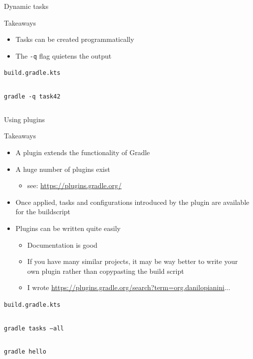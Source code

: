 \documentclass[presentation]{beamer}
\newcommand{\codefile}[4]{
	\begin{block}{\texttt{#2}}
		\inputminted[fontsize=#3,linenos=true,breaklines=true]{#4}{"workspace/#1/#2"}
	\end{block}
}
\newcommand{\kotlin}[3]{\codefile{#1}{#2}{#3}{kotlin}}
\newcommand{\terminal}[3]{\codefile{#1}{#2}{#3}{text}}
\newcommand{\tinier}{\fontsize{4pt}{5pt}\selectfont}
\begin{document}
\begin{frame}{Dynamic tasks}
    \begin{block}{Takeaways}
        \begin{itemize}
            \item Tasks can be created programmatically
            \item The \texttt{-q} flag quietens the output
        \end{itemize}
    \end{block}
    \kotlin{05-DynamicTasks}{build.gradle.kts}{\scriptsize}
    \terminal{05-DynamicTasks}{gradle -q task42}{\normalsize}
\end{frame}

\begin{frame}{Using plugins}
    \begin{block}{Takeaways}
        \begin{itemize}
            \item A plugin extends the functionality of Gradle
            \item A huge number of plugins exist
            \begin{itemize}
                \item see: \url{https://plugins.gradle.org/}
            \end{itemize}
            \item Once applied, tasks and configurations introduced by the plugin are available for the buildscript
            \item Plugins can be written quite easily
            \begin{itemize}
                \item Documentation is good
                \item If you have many similar projects, it may be way better to write your own plugin rather than copypasting the build script
                \item I wrote \href{several plugins myself}{https://plugins.gradle.org/search?term=org.danilopianini}...
            \end{itemize}
        \end{itemize}
    \end{block}
    \kotlin{08-Plugin}{build.gradle.kts}{\scriptsize}
    \terminal{08-Plugin}{gradle tasks --all}{\tiny}
    \terminal{08-Plugin}{gradle hello}{\tinier}
\end{frame}
\end{document}
